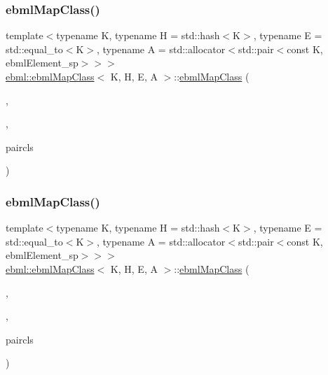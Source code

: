 \subsubsection{\texorpdfstring{ebml\+Map\+Class()}{ebmlMapClass()}\hspace{0.1cm}{\footnotesize\ttfamily [1/4]}}
{\footnotesize\ttfamily template$<$typename K, typename H = std\+::hash$<$\+K$>$, typename E = std\+::equal\+\_\+to$<$\+K$>$, typename A = std\+::allocator$<$std\+::pair$<$const K, ebml\+Element\+\_\+sp$>$$>$$>$ \\
\mbox{\hyperlink{classebml_1_1ebmlMapClass}{ebml\+::ebml\+Map\+Class}}$<$ K, H, E, A $>$\+::\mbox{\hyperlink{classebml_1_1ebmlMapClass}{ebml\+Map\+Class}} (\begin{DoxyParamCaption}\item[{const char $\ast$}]{,  }\item[{const std\+::wstring \&}]{,  }\item[{const \mbox{\hyperlink{classebml_1_1ebmlElementClass}{ebml\+Element\+Class}} $\ast$}]{paircls }\end{DoxyParamCaption})}

\mbox{\label{classebml_1_1ebmlMapClass_afe37bc0187986569ba263fe2a5e69915}} 
\subsubsection{\texorpdfstring{ebml\+Map\+Class()}{ebmlMapClass()}\hspace{0.1cm}{\footnotesize\ttfamily [2/4]}}
{\footnotesize\ttfamily template$<$typename K, typename H = std\+::hash$<$\+K$>$, typename E = std\+::equal\+\_\+to$<$\+K$>$, typename A = std\+::allocator$<$std\+::pair$<$const K, ebml\+Element\+\_\+sp$>$$>$$>$ \\
\mbox{\hyperlink{classebml_1_1ebmlMapClass}{ebml\+::ebml\+Map\+Class}}$<$ K, H, E, A $>$\+::\mbox{\hyperlink{classebml_1_1ebmlMapClass}{ebml\+Map\+Class}} (\begin{DoxyParamCaption}\item[{const char $\ast$}]{,  }\item[{const std\+::wstring \&}]{,  }\item[{const \mbox{\hyperlink{classebml_1_1ebmlPairClass}{ebml\+Pair\+Class}}$<$ const K $>$ $\ast$}]{paircls }\end{DoxyParamCaption})}

